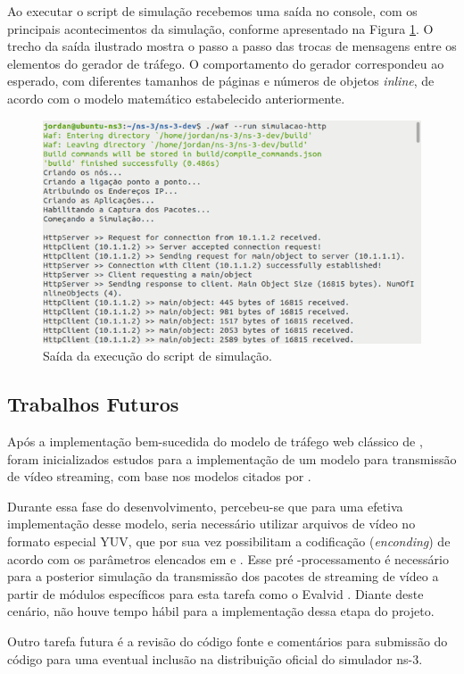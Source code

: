 Ao executar o script de simulação recebemos uma saída no console, com os principais acontecimentos da simulação, conforme apresentado na Figura \ref{fig:simulation-output}. O trecho da saída ilustrado mostra o passo a passo das trocas de mensagens entre os elementos do gerador de tráfego. O comportamento do gerador correspondeu ao esperado, com diferentes tamanhos de páginas e números de objetos \textit{inline}, de acordo com o modelo matemático estabelecido anteriormente.

\begin{figure}
	\centering
	\includegraphics[scale=1]{textuais/simulation-output.png}
	\caption[Saída da execução do script de simulação.]{Saída da execução do script de simulação.
		\label{fig:simulation-output}}
\end{figure}

\subsection{Trabalhos Futuros}
Após a implementação bem-sucedida do modelo de tráfego web clássico de \cite{Pries2012}, foram inicializados estudos para a implementação de um modelo para transmissão de vídeo streaming, com base nos modelos citados por \cite{Navarro-Ortiz2020}. 

Durante essa fase do desenvolvimento, percebeu-se que para uma efetiva implementação desse modelo, seria necessário utilizar arquivos de vídeo no formato especial YUV, que por sua vez possibilitam a codificação (\textit{enconding}) de acordo com os parâmetros elencados em \cite{Navarro-Ortiz2020} e \cite{youtube-recommendations}. Esse pré -processamento é necessário para a posterior simulação da transmissão dos pacotes de streaming de vídeo a partir de módulos específicos para esta tarefa como o Evalvid \cite{evalvid}. Diante deste cenário, não houve tempo hábil para a implementação dessa etapa do projeto.

Outro tarefa futura é a revisão do código fonte e comentários para submissão do código para uma eventual inclusão na distribuição oficial do simulador ns-3.


